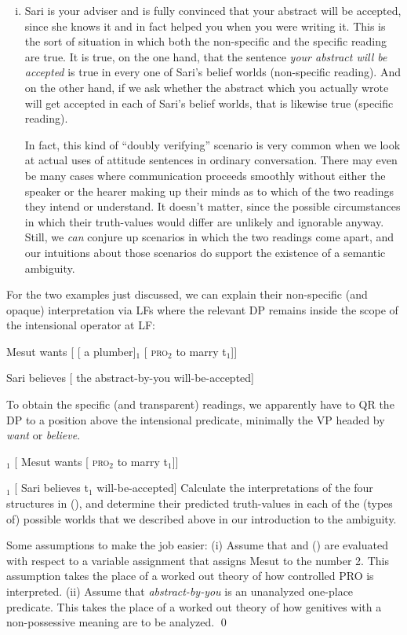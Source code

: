 \begin{enumerate}[(i)]
\item Sari is your adviser and is fully convinced that your abstract will be
  accepted, since she knows it and in fact helped you when you were writing it.
  This is the sort of situation in which both the non-specific and the specific
  reading are true. It is true, on the one hand, that the sentence \emph{your
    abstract will be accepted} is true in every one of Sari's belief worlds
  (non-specific reading). And on the other hand, if we ask whether the abstract
  which you actually wrote will get accepted in each of Sari's belief worlds,
  that is likewise true (specific reading).
	
	In fact, this kind of ``doubly verifying'' scenario is very common when we
  look at actual uses of attitude sentences in ordinary conversation. There may
  even be many cases where communication proceeds smoothly without either the
  speaker or the hearer making up their minds as to which of the two readings
  they intend or understand. It doesn't matter, since the possible circumstances
  in which their truth-values would differ are unlikely and ignorable anyway.
  Still, we \emph{can} conjure up scenarios in which the two readings come
  apart, and our intuitions about those scenarios do support the existence of a
  semantic ambiguity.
  
\end{enumerate}

\begin{exercise}

For the two examples just discussed, we can explain their non-specific (and
opaque) interpretation via LFs where the relevant DP remains inside the scope of
the intensional operator at LF:

\ex\label{first} Mesut wants [ [ a plumber]$_1$ [ \textsc{pro}$_2$ to marry
t$_1$]] \xe

\ex Sari believes [ the abstract-by-you will-be-accepted] \xe

To obtain the specific (and transparent) readings, we apparently have to QR the
DP to a position above the intensional predicate, minimally the VP headed by
\emph{want} or \emph{believe}.

\ex\null [ a plumber]$_1$ [ Mesut wants [ \textsc{pro}$_2$ to marry t$_1$]] \xe

\ex{}$_1$ [ Sari believes t$_1$ will-be-accepted] \xe
%	
Calculate the interpretations of the four structures in
\dash(\lastx), and determine their predicted truth-values in each of
the (types of) possible worlds that we described above in our introduction to
the ambiguity.
	
Some assumptions to make the job easier: (i) Assume that  and
(\blastx) are evaluated with respect to a variable assignment that assigns Mesut
to the number 2. This assumption takes the place of a worked out theory of how
controlled PRO is interpreted. (ii) Assume that \emph{abstract-by-you} is an
unanalyzed one-place predicate. This takes the place of a worked out theory of
how genitives with a non-possessive meaning are to be analyzed. \qed
\end{exercise}

